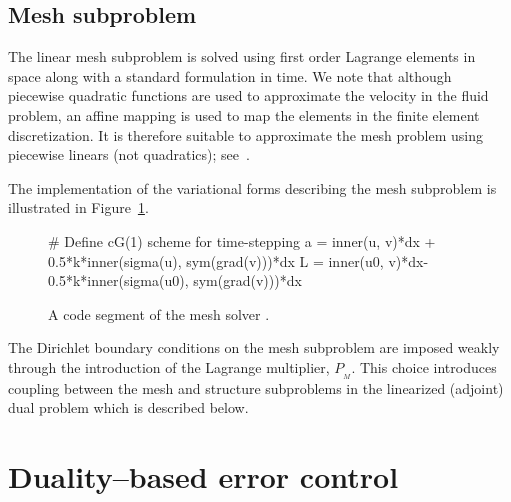 \subsection{Mesh subproblem}

The linear mesh subproblem is solved using first order Lagrange
elements in space along with a standard \cgone{} formulation in time. We
note that although piecewise quadratic functions are used to
approximate the velocity in the fluid problem, an affine mapping is
used to map the elements in the finite element discretization. It is
therefore suitable to approximate the mesh problem using piecewise
linears (not quadratics); see~\citet{FormaggiaNobile1999}.

The implementation of the variational forms describing the mesh
subproblem is illustrated in Figure~\ref{selim:fig:meshsolver}.
\begin{figure}
\begin{python}
# Define cG(1) scheme for time-stepping
a = inner(u, v)*dx + 0.5*k*inner(sigma(u), sym(grad(v)))*dx
L = inner(u0, v)*dx-0.5*k*inner(sigma(u0), sym(grad(v)))*dx
\end{python}
\caption{A code segment of the mesh solver .}
\label{selim:fig:meshsolver}
\end{figure}
The Dirichlet boundary conditions on the mesh subproblem are imposed
weakly through the introduction of the Lagrange multiplier,
$P_{_{M}}$. This choice introduces coupling between the mesh and
structure subproblems in the linearized (adjoint) dual problem which
is described below.

\section{Duality--based error control}

